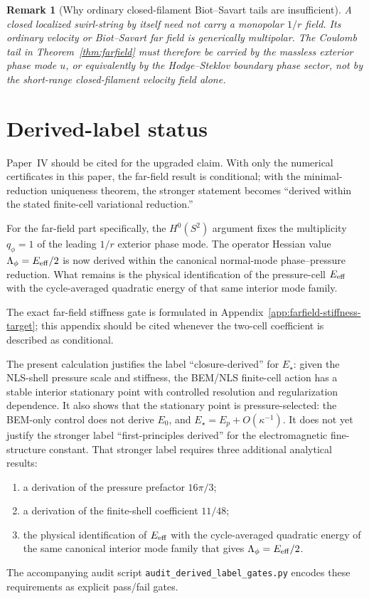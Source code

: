 \documentclass[11pt]{article}
\newtheorem{remark}{Remark}
\begin{document}
\begin{remark}[Why ordinary closed-filament Biot--Savart tails are insufficient]
A closed localized swirl-string by itself need not carry a monopolar \(1/r\) field. Its ordinary velocity or Biot--Savart far field is generically multipolar. The Coulomb tail in Theorem~\ref{thm:farfield} must therefore be carried by the massless exterior phase mode \(u\), or equivalently by the Hodge--Steklov boundary phase sector, not by the short-range closed-filament velocity field alone.
\end{remark}


\section{Derived-label status}


Paper~IV should be cited for the upgraded claim.  With only the numerical
certificates in this paper, the far-field result is conditional; with the
minimal-reduction uniqueness theorem, the stronger statement becomes
``derived within the stated finite-cell variational reduction.''



For the far-field part specifically, the \(H^0(S^2)\) argument fixes the
multiplicity \(q_\phi=1\) of the leading \(1/r\) exterior phase mode.  The
operator Hessian value \(\Lambda_\phi=E_{\rm eff}/2\) is now derived within the
canonical normal-mode phase--pressure reduction.  What remains is the physical
identification of the pressure-cell \(E_{\rm eff}\) with the cycle-averaged
quadratic energy of that same interior mode family.


The exact far-field stiffness gate is formulated in Appendix~\ref{app:farfield-stiffness-target}; this appendix should be cited whenever the two-cell coefficient is described as conditional.


\label{sec:derived-label-status}

The present calculation justifies the label ``closure-derived'' for
\(E_\star\): given the NLS-shell pressure scale and stiffness, the BEM/NLS
finite-cell action has a stable interior stationary point with controlled
resolution and regularization dependence.  It also shows that the stationary
point is pressure-selected: the BEM-only control does not derive \(E_0\), and
\(E_\star=E_p+O(\kappa^{-1})\).  It does not yet justify the stronger label
``first-principles derived'' for the electromagnetic fine-structure constant.
That stronger label requires three additional analytical results:
\begin{enumerate}
\item a derivation of the pressure prefactor \(16\pi/3\);
\item a derivation of the finite-shell coefficient \(11/48\);
\item the physical identification of \(E_{\rm eff}\) with the cycle-averaged
      quadratic energy of the same canonical interior mode family that gives
      \(\Lambda_\phi=E_{\rm eff}/2\).
\end{enumerate}
The accompanying audit script \texttt{audit\_derived\_label\_gates.py} encodes
these requirements as explicit pass/fail gates.
\end{document}
